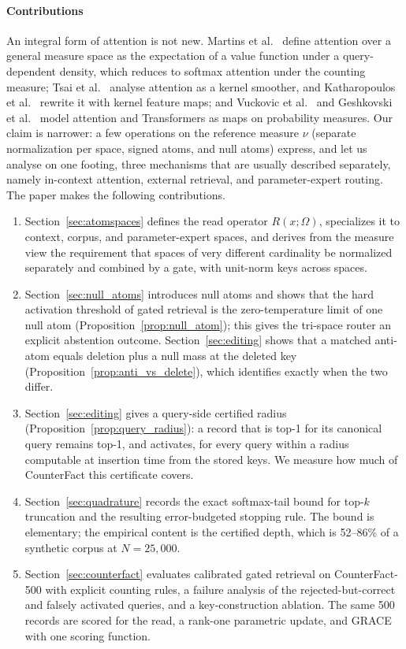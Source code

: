 \documentclass[preprint,12pt]{elsarticle}
\newcommand{\Om}{\Omega}
\newcommand{\rev}[1]{#1}
\begin{document}
\paragraph{Contributions}
\rev{An integral form of attention is not new. Martins et al.~\cite{martins2020sparse} define attention over a general measure space as the expectation of a value function under a query-dependent density, which reduces to softmax attention under the counting measure; Tsai et al.~\cite{tsai2019transformer} analyse attention as a kernel smoother, and Katharopoulos et al.~\cite{katharopoulos2020transformers} rewrite it with kernel feature maps; and Vuckovic et al.~\cite{vuckovic2020mathematical} and Geshkovski et al.~\cite{geshkovski2025mathematical} model attention and Transformers as maps on probability measures. Our claim is narrower: a few operations on the reference measure $\nu$ (separate normalization per space, signed atoms, and null atoms) express, and let us analyse on one footing, three mechanisms that are usually described separately, namely in-context attention, external retrieval, and parameter-expert routing.} The paper makes the following contributions.
\begin{enumerate}[leftmargin=*,label=(\roman*)]
\item Section~\ref{sec:atomspaces} defines the read operator $R(x;\Om)$, specializes it to context, corpus, and parameter-expert spaces, and derives from the measure view the requirement that spaces of very different cardinality be normalized separately and combined by a gate, with unit-norm keys across spaces.
\item \rev{Section~\ref{sec:null_atoms} introduces null atoms and shows that the hard activation threshold of gated retrieval is the zero-temperature limit of one null atom (Proposition~\ref{prop:null_atom}); this gives the tri-space router an explicit abstention outcome. Section~\ref{sec:editing} shows that a matched anti-atom equals deletion plus a null mass at the deleted key (Proposition~\ref{prop:anti_vs_delete}), which identifies exactly when the two differ.}
\item \rev{Section~\ref{sec:editing} gives a query-side certified radius (Proposition~\ref{prop:query_radius}): a record that is top-1 for its canonical query remains top-1, and activates, for every query within a radius computable at insertion time from the stored keys. We measure how much of CounterFact this certificate covers.}
\item Section~\ref{sec:quadrature} records the exact softmax-tail bound for top-$k$ truncation and the resulting error-budgeted stopping rule. \rev{The bound is elementary; the empirical content is the certified depth, which is 52--86\% of a synthetic corpus at $N=25{,}000$.}
\item Section~\ref{sec:counterfact} evaluates calibrated gated retrieval on CounterFact-500 with explicit counting rules, \rev{a failure analysis of the rejected-but-correct and falsely activated queries, and a key-construction ablation}. The same 500 records are scored for the read, a rank-one parametric update, and GRACE \cite{hartvigsen2023aging} \rev{with one scoring function}.
\end{enumerate}
\end{document}

